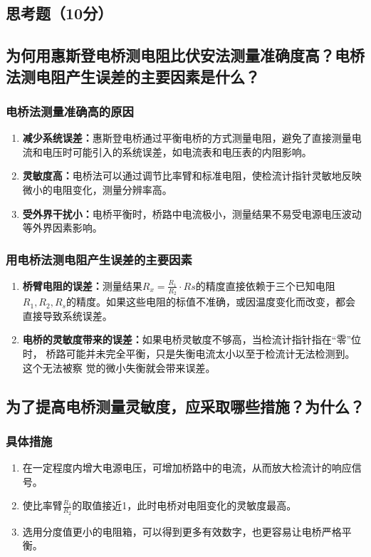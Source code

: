 \documentclass[]{../../templates/Report}%
\begin{document}
\begin{fullreportonly}
\section{思考题（10分）}
\subsection{为何用惠斯登电桥测电阻比伏安法测量准确度高？电桥法测电阻产生误差的主要因素是什么？}

\subsubsection{电桥法测量准确高的原因}
\begin{enumerate}
    \item \textbf{减少系统误差：}惠斯登电桥通过平衡电桥的方式测量电阻，避免了直接测量电流和电压时可能引入的系统误差，如电流表和电压表的内阻影响。
    \item \textbf{灵敏度高：}电桥法可以通过调节比率臂和标准电阻，使检流计指针灵敏地反映微小的电阻变化，测量分辨率高。
    \item \textbf{受外界干扰小：}电桥平衡时，桥路中电流极小，测量结果不易受电源电压波动等外界因素影响。
\end{enumerate}
\subsubsection{用电桥法测电阻产生误差的主要因素}
\begin{enumerate}
    \item \textbf{桥臂电阻的误差：}测量结果$ R_x = \frac{R_1}{R_2} \cdot Rs $的精度直接依赖于三个已知电阻$R_1, R_2, R_s$的精度。如果这些电阻的标值不准确，或因温度变化而改变，都会直接导致系统误差。
    \item \textbf{电桥的灵敏度带来的误差：}如果电桥灵敏度不够高，当检流计指针指在“零”位时，
        桥路可能并未完全平衡，只是失衡电流太小以至于检流计无法检测到。这个无法被察
        觉的微小失衡就会带来误差。
\end{enumerate}

\subsection{为了提高电桥测量灵敏度，应采取哪些措施？为什么？}
\subsubsection{具体措施}
\begin{enumerate}
    \item 在一定程度内增大电源电压，可增加桥路中的电流，从而放大检流计的响应信号。
    \item 使比率臂$\frac{R_1}{R_2}$的取值接近1，此时电桥对电阻变化的灵敏度最高。
    \item 选用分度值更小的电阻箱，可以得到更多有效数字，也更容易让电桥严格平衡。
\end{enumerate}

\end{fullreportonly}
\end{document}
